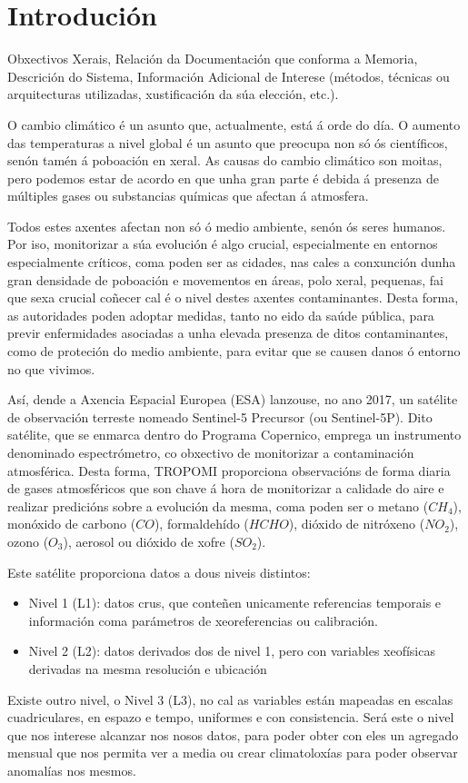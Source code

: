 \chapter{Introdución}\label{introducion}

Obxectivos Xerais, Relación da Documentación que conforma a Memoria,
Descrición do Sistema, Información Adicional de Interese (métodos, técnicas ou
arquitecturas utilizadas, xustificación da súa elección, etc.).
\newline

O cambio climático é un asunto que, actualmente, está á orde do día. O aumento das temperaturas a nivel global é un asunto que preocupa non só ós
científicos, senón tamén á poboación en xeral. As causas do cambio climático son moitas, pero podemos estar de acordo en que unha gran parte é
debida á presenza de múltiples gases ou substancias químicas que afectan á atmosfera.

Todos estes axentes afectan non só ó medio ambiente, senón ós seres humanos. Por iso, monitorizar a súa evolución é algo crucial, especialmente en
entornos especialmente críticos, coma poden ser as cidades, nas cales a conxunción dunha gran densidade de poboación e movementos en áreas, polo xeral,
pequenas, fai que sexa crucial coñecer cal é o nivel destes axentes contaminantes. Desta forma, as autoridades poden adoptar medidas, tanto no eido
da saúde pública, para previr enfermidades asociadas a unha elevada presenza de ditos contaminantes, como de proteción do medio ambiente, para evitar
que se causen danos ó entorno no que vivimos.

Así, dende a Axencia Espacial Europea (ESA) lanzouse, no ano 2017, un satélite de observación terreste nomeado Sentinel-5 Precursor (ou Sentinel-5P).
Dito satélite, que se enmarca dentro do Programa Copernico, emprega un instrumento denominado espectrómetro, co obxectivo de monitorizar a contaminación
atmosférica. Desta forma, TROPOMI proporciona observacións de forma diaria de gases atmosféricos que son chave á hora de monitorizar a calidade do aire
e realizar predicións sobre a evolución da mesma, coma poden ser o metano ($CH_{4}$), monóxido de carbono ($CO$), formaldehído ($HCHO$), dióxido de nitróxeno
($NO_{2}$), ozono ($O_{3}$), aerosol ou dióxido de xofre ($SO_{2}$).

Este satélite proporciona datos a dous niveis distintos:
\begin{itemize}
    \item Nivel 1 (L1): datos crus, que conteñen unicamente referencias temporais e información coma parámetros de xeoreferencias ou calibración.
    \item Nivel 2 (L2): datos derivados dos de nivel 1, pero con variables xeofísicas derivadas na mesma resolución e ubicación
\end{itemize}
Existe outro nivel, o Nivel 3 (L3), no cal as variables están mapeadas en escalas cuadriculares, en espazo e tempo, uniformes e con consistencia.
Será este o nivel que nos interese alcanzar nos nosos datos, para poder obter con eles un agregado mensual que nos permita ver a media ou crear climatoloxías
para poder observar anomalías nos mesmos.

